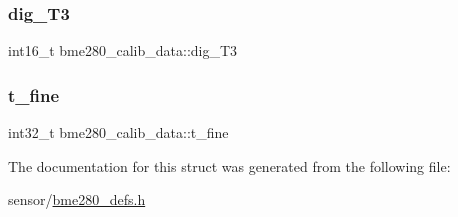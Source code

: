 \subsubsection{\texorpdfstring{dig\+\_\+\+T3}{dig\_T3}}
{\footnotesize\ttfamily int16\+\_\+t bme280\+\_\+calib\+\_\+data\+::dig\+\_\+\+T3}

\mbox{\label{structbme280__calib__data_a035b8d8756456820ec82f26a2cf62ffa}} 
\subsubsection{\texorpdfstring{t\+\_\+fine}{t\_fine}}
{\footnotesize\ttfamily int32\+\_\+t bme280\+\_\+calib\+\_\+data\+::t\+\_\+fine}



The documentation for this struct was generated from the following file\+:\begin{DoxyCompactItemize}
\item 
sensor/\hyperlink{bme280__defs_8h}{bme280\+\_\+defs.\+h}\end{DoxyCompactItemize}

